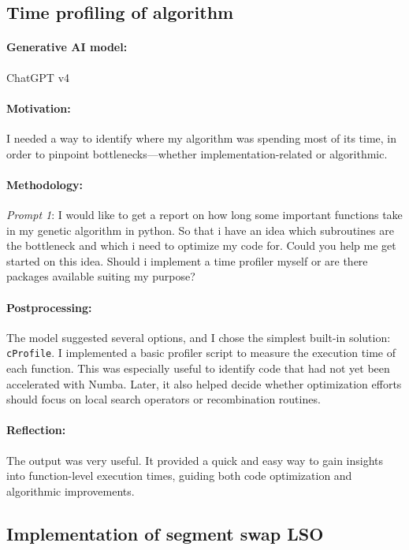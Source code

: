 \documentclass[a4paper,10pt]{article} %
\begin{document}
\subsection{Time profiling of algorithm} 
\paragraph{Generative AI model:} ChatGPT v4

\paragraph{Motivation:} 
I needed a way to identify where my algorithm was spending most of its time, in order to pinpoint bottlenecks—whether implementation-related or algorithmic.

\paragraph{Methodology:} 
\textit{Prompt 1}:
I would like to get a report on how long some important functions take in my genetic algorithm in python. So that i have an idea which subroutines are the bottleneck and which i need to optimize my code for. Could you help me get started on this idea. Should i implement a time profiler myself or are there packages available suiting my purpose?
\paragraph{Postprocessing:} 
The model suggested several options, and I chose the simplest built-in solution: \texttt{cProfile}. I implemented a basic profiler script to measure the execution time of each function. This was especially useful to identify code that had not yet been accelerated with Numba. Later, it also helped decide whether optimization efforts should focus on local search operators or recombination routines.

\paragraph{Reflection:} 
The output was very useful. It provided a quick and easy way to gain insights into function-level execution times, guiding both code optimization and algorithmic improvements.



\subsection{Implementation of segment swap LSO} 
\end{document}
